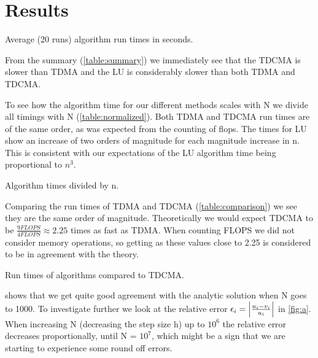\section*{Results}

\begin{table}[htp]
  \centering
  \caption{Average (20 runs) algorithm run times in seconds.}
  \label{table:summary}
\end{table}


From the summary (\cref{table:summary}) we immediately see that the
TDCMA is slower than TDMA and the LU is considerably slower than both TDMA and
TDCMA.



To see how the algorithm time for our different methods scales with N we divide
all timings with N (\cref{table:normalized}). Both TDMA and TDCMA run times are
of the same order, as was expected from the counting of flops. The times for LU
show an increase of two orders of magnitude for each magnitude increase in n.
This is consistent with our expectations of the LU algorithm time being
proportional to $n^3$.

\begin{table}[htp]
  \centering
  \caption{Algorithm times divided by n.}
  \label{table:normalized}
\end{table}


Comparing the run times of TDMA and TDCMA (\cref{table:comparison})
we see they are the same order of magnitude. Theoretically we would
expect TDCMA to be $\frac{9 FLOPS}{4 FLOPS} \approx 2.25$ times as fast as
TDMA. When counting FLOPS we did not consider memory operations, so getting as
these values close to 2.25 is considered to be in agreement with the theory.

\begin{table}[htp]
  \centering
  \caption{Run times of algorithms compared to TDCMA.}
  \label{table:comparison}
\end{table}


 shows that we get quite good agreement with the analytic solution
when N goes to 1000. To investigate further we look at the relative error
$\epsilon_i = \abs{\frac{u_i - v_i}{u_i}}$ in \cref{fig:a}.
When increasing N (decreasing the step size h) up to $10^6$ the relative error
decreases proportionally, until N = $10^7$, which might be a sign that we are
starting to experience some round off errors.


